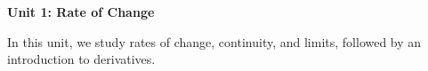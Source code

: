 \noindent\textbf{Unit 1: Rate of Change}

In this unit, we study rates of change, continuity, and limits, followed by an introduction to derivatives.
